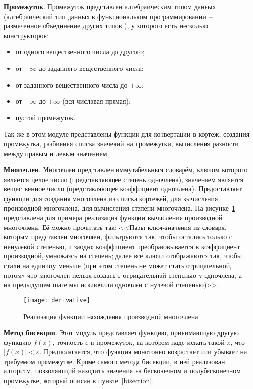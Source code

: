 \textbf{Промежуток}.\label{intervaldescr} Промежуток представлен алгебраическим типом данных
(алгебраический тип данных в функциональном программировании~-- размеченное объединение
других типов \cite{fprog-adt}),
у которого есть несколько конструкторов:

\begin{itemize}
    \item от одного вещественного числа до другого;
    \item от \(-\infty\) до заданного вещественного числа;
    \item от заданного вещественного числа до \(+\infty\);
    \item от \(-\infty\) до \(+\infty\) (вся числовая прямая);
    \item пустой промежуток.
\end{itemize}

Так же в этом модуле представлены функции для конвертации в кортеж, создания промежутка,
разбиения списка значений на промежутки, вычисления разности между правым и левым значением.

\textbf{Многочлен}.\label{polynomialdescr}
Многочлен представлен иммутабельным словарём, ключом которого является целое число (представляющее степень одночлена),
значением является вещественное число (представляющее коэффициент одночлена).
Предоставляет функции для создания многочлена из списка кортежей, для вычисления производной многочлена, для вычисления степени многочлена.
На рисунке~\ref{derivativecode} представлена для примера реализация функции вычисления производной многочлена. Её можно прочитать так:
<<Пары ключ-значения из словаря, которым представлен многочлен, фильтруются так, чтобы остались только с ненулевой степенью,
и заодно коэффициент преобразовывается в коэффициент производной, умножаясь на степень; далее все ключи отображаются так, чтобы стали на единицу меньше
(при этом степень не может стать отрицательной, потому что многочлен нельзя создать с отрицательной степенью у одночлена,
а на предыдущем шаге мы исключили одночлен с нулевой степенью)>>.

\begin{figure}[H]
    \centering
    \texttt{[image: derivative]}
    \caption{Реализация функции нахождения производной многочлена\label{derivativecode}}
\end{figure}

\textbf{Метод бисекции}.\label{bisectiondescr}
Этот модуль представляет функцию, принимающую другую функцию \(f(x)\), точность \(\varepsilon\)
и промежуток, на котором надо искать такой \(x\), что \(\left|f(x)\right| < \varepsilon\). Предполагается, что
функция монотонно возрастает или убывает на требуемом промежутке. Кроме самого метода бисекции, в ней реализован алгоритм,
позволяющий находить значения на бесконечном и полубесконечном промежутке, который описан в пункте~\ref{bisection}.


